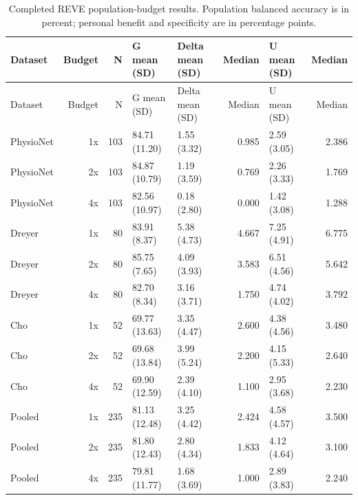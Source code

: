 \begin{longtable}{p{.8in}rrp{.9in}p{1.0in}rp{1.0in}r}
\caption{Completed REVE population-budget results. Population balanced accuracy is in percent; personal benefit and specificity are in percentage points.}\label{tab:budget_reve}\\
\toprule
Dataset & Budget & N & G mean (SD) & Delta mean (SD) & Median & U mean (SD) & Median \\
\midrule
\endfirsthead
\toprule
Dataset & Budget & N & G mean (SD) & Delta mean (SD) & Median & U mean (SD) & Median \\
\midrule
\endhead
PhysioNet & 1x & 103 & 84.71 (11.20) & 1.55 (3.32) & 0.985 & 2.59 (3.05) & 2.386 \\
PhysioNet & 2x & 103 & 84.87 (10.79) & 1.19 (3.59) & 0.769 & 2.26 (3.33) & 1.769 \\
PhysioNet & 4x & 103 & 82.56 (10.97) & 0.18 (2.80) & 0.000 & 1.42 (3.08) & 1.288 \\
Dreyer & 1x & 80 & 83.91 (8.37) & 5.38 (4.73) & 4.667 & 7.25 (4.91) & 6.775 \\
Dreyer & 2x & 80 & 85.75 (7.65) & 4.09 (3.93) & 3.583 & 6.51 (4.56) & 5.642 \\
Dreyer & 4x & 80 & 82.70 (8.34) & 3.16 (3.71) & 1.750 & 4.74 (4.02) & 3.792 \\
Cho & 1x & 52 & 69.77 (13.63) & 3.35 (4.47) & 2.600 & 4.38 (4.56) & 3.480 \\
Cho & 2x & 52 & 69.68 (13.84) & 3.99 (5.24) & 2.200 & 4.15 (5.33) & 2.640 \\
Cho & 4x & 52 & 69.90 (12.59) & 2.39 (4.10) & 1.100 & 2.95 (3.68) & 2.230 \\
Pooled & 1x & 235 & 81.13 (12.48) & 3.25 (4.42) & 2.424 & 4.58 (4.57) & 3.500 \\
Pooled & 2x & 235 & 81.80 (12.43) & 2.80 (4.34) & 1.833 & 4.12 (4.64) & 3.100 \\
Pooled & 4x & 235 & 79.81 (11.77) & 1.68 (3.69) & 1.000 & 2.89 (3.83) & 2.240 \\
\bottomrule
\end{longtable}
